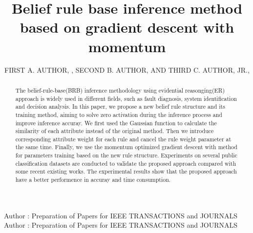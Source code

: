 \documentclass{ieeeaccess}
\begin{document}

\title{Belief rule base inference method based on gradient descent with momentum}
\author{\uppercase{First A. Author}, ,
    \uppercase{Second B. Author, and Third C. Author,
        Jr}.,
    }
\address[1]{National Institute of Standards and
    Technology, Boulder, CO 80305 USA (e-mail: author@boulder.nist.gov)}
\address[2]{Department of Physics, Colorado State University, Fort Collins,
    CO 80523 USA (e-mail: author@lamar.colostate.edu)}
\address[3]{Electrical Engineering Department, University of Colorado, Boulder, CO
    80309 USA}

\markboth
{Author \headeretal: Preparation of Papers for IEEE TRANSACTIONS and JOURNALS}
{Author \headeretal: Preparation of Papers for IEEE TRANSACTIONS and JOURNALS}


\begin{abstract}

    The belief-rule-base(BRB) inference methodology using evidential reasonging(ER)
    approach is widely used in different fields, such as  fault diagnosis, system
    identification and decision analysis.
    In this paper, we propose a new belief rule structure and its training method,
    aiming to solve zero activation during the inference process and improve inference accuray.
    We first used the Gaussian function to calculate the similarity of each attribute instead of the original method.
    Then we introduce corresponding attribute weight for each rule and cancel the rule weight parameter at the same time.
    Finally, we use the momentum optimized gradient descent with method for parameters training based on the new rule structure.
    Experiments on several public classification datasets are conducted to validate the proposed approach compared with some recent existing works.
    The experimental results show that the proposed approach have a better performence in accuray and time consumption.

\end{abstract}
\end{document}
